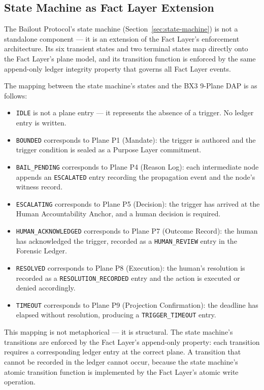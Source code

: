 \documentclass[12pt]{article}
\begin{document}
\subsection{State Machine as Fact Layer Extension}
\label{sec:state-machine-fact-layer}

The Bailout Protocol's state machine (Section~\ref{sec:state-machine}) is not a standalone component --- it is an extension of the Fact Layer's enforcement architecture. Its six transient states and two terminal states map directly onto the Fact Layer's plane model, and its transition function is enforced by the same append-only ledger integrity property that governs all Fact Layer events.

The mapping between the state machine's states and the BX3 9-Plane DAP is as follows:

\begin{itemize}
  \item \texttt{IDLE} is not a plane entry --- it represents the absence of a trigger. No ledger entry is written.
  \item \texttt{BOUNDED} corresponds to Plane P1 (Mandate): the trigger is authored and the trigger condition is sealed as a Purpose Layer commitment.
  \item \texttt{BAIL\_PENDING} corresponds to Plane P4 (Reason Log): each intermediate node appends an \texttt{ESCALATED} entry recording the propagation event and the node's witness record.
  \item \texttt{ESCALATING} corresponds to Plane P5 (Decision): the trigger has arrived at the Human Accountability Anchor, and a human decision is required.
  \item \texttt{HUMAN\_ACKNOWLEDGED} corresponds to Plane P7 (Outcome Record): the human has acknowledged the trigger, recorded as a \texttt{HUMAN\_REVIEW} entry in the Forensic Ledger.
  \item \texttt{RESOLVED} corresponds to Plane P8 (Execution): the human's resolution is recorded as a \texttt{RESOLUTION\_RECORDED} entry and the action is executed or denied accordingly.
  \item \texttt{TIMEOUT} corresponds to Plane P9 (Projection Confirmation): the deadline has elapsed without resolution, producing a \texttt{TRIGGER\_TIMEOUT} entry.
\end{itemize}

This mapping is not metaphorical --- it is structural. The state machine's transitions are enforced by the Fact Layer's append-only property: each transition requires a corresponding ledger entry at the correct plane. A transition that cannot be recorded in the ledger cannot occur, because the state machine's atomic transition function is implemented by the Fact Layer's atomic write operation.
\end{document}
